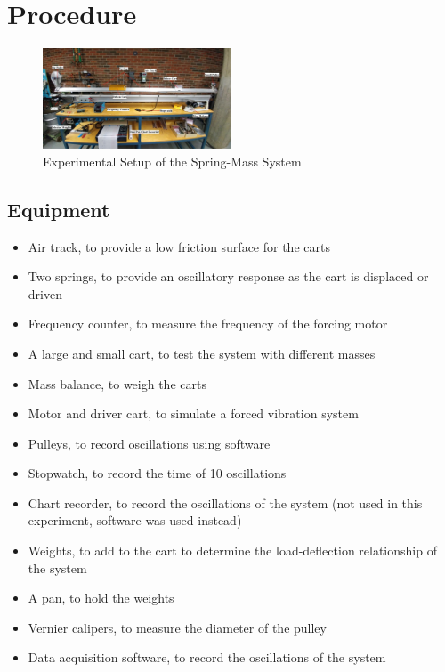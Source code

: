 \section{Procedure}
\begin{figure}[h]
    \centering
    \includegraphics[width=0.5\textwidth]{Sections/Figures/experimental setup.jpg}
    \caption{Experimental Setup of the Spring-Mass System}
\end{figure}
\subsection{Equipment}
\begin{itemize}
    \item Air track, to provide a low friction surface for the carts
    \item Two springs, to provide an oscillatory response as the cart is displaced or driven
    \item Frequency counter, to measure the frequency of the forcing motor
    \item A large and small cart, to test the system with different masses
    \item Mass balance, to weigh the carts
    \item Motor and driver cart, to simulate a forced vibration system
    \item Pulleys, to record oscillations using software
    \item Stopwatch, to record the time of 10 oscillations
    \item Chart recorder, to record the oscillations of the system (not used in this experiment, software was used instead)
    \item Weights, to add to the cart to determine the load-deflection relationship of the system
    \item A pan, to hold the weights
    \item Vernier calipers, to measure the diameter of the pulley
    \item Data acquisition software, to record the oscillations of the system
\end{itemize}

